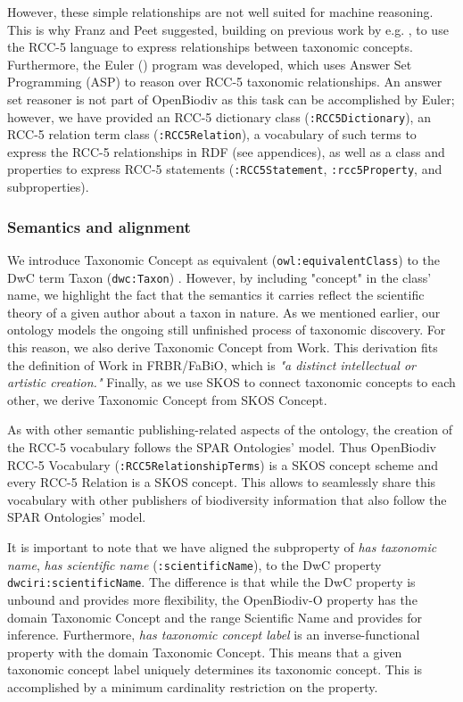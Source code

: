 However, these simple relationships are not well suited for machine reasoning. This is why Franz and Peet \cite{franz_perspectives:_2009} suggested, building on previous work by e.g. \cite{koperski_referenzliste_2000}, to use the RCC-5 language to express relationships between taxonomic concepts. Furthermore, the Euler (\cite{chen_euler/x:_2014}) program was developed, which uses Answer Set Programming (ASP) to reason over RCC-5 taxonomic relationships. An answer set reasoner is not part of  OpenBiodiv as this task can be accomplished by Euler; however, we have provided an RCC-5 dictionary class ({\tt :RCC5Dictionary}), an RCC-5 relation term class ({\tt :RCC5Relation}), a vocabulary of such terms to express the RCC-5 relationships in RDF (see appendices), as well as a class and properties to express RCC-5 statements ({\tt :RCC5Statement}, {\tt :rcc5Property}, and subproperties). 

\subsubsection{Semantics and alignment}

We introduce Taxonomic Concept as equivalent ({\tt owl:equivalentClass}) to the DwC term Taxon ({\tt dwc:Taxon}) \cite{noauthor_darwincore_nodate}. However, by including "concept" in the class' name, we highlight the fact that the semantics it carries reflect the scientific theory of a given author about a taxon in nature. As we mentioned earlier, our ontology models the ongoing still unfinished process of taxonomic discovery. For this reason, we also derive Taxonomic Concept from Work. This derivation fits the definition of Work in FRBR/FaBiO, which is \emph{"a distinct intellectual or artistic creation."} Finally, as we use SKOS to connect taxonomic concepts to each other, we derive Taxonomic Concept from SKOS Concept.

As with other semantic publishing-related aspects of the ontology, the creation of the RCC-5 vocabulary follows the SPAR Ontologies' model. Thus OpenBiodiv RCC-5 Vocabulary ({\tt :RCC5RelationshipTerms}) is a SKOS concept scheme and every RCC-5 Relation is a SKOS concept. This allows to seamlessly share this vocabulary with other publishers of biodiversity information that also follow the SPAR Ontologies' model.

It is important to note that we have aligned the subproperty of \emph{has taxonomic name}, \emph{has scientific name} ({\tt :scientificName}), to the DwC property {\tt dwciri:scientificName}. The difference is that while the DwC property is unbound and provides more flexibility, the \mbox{OpenBiodiv-O} property has the domain Taxonomic Concept and the range Scientific Name and provides for inference. Furthermore, \emph{has taxonomic concept label} is an inverse-functional property with the domain Taxonomic Concept. This means that a given taxonomic concept label uniquely determines its taxonomic concept. This is accomplished by a minimum cardinality restriction on the property.

